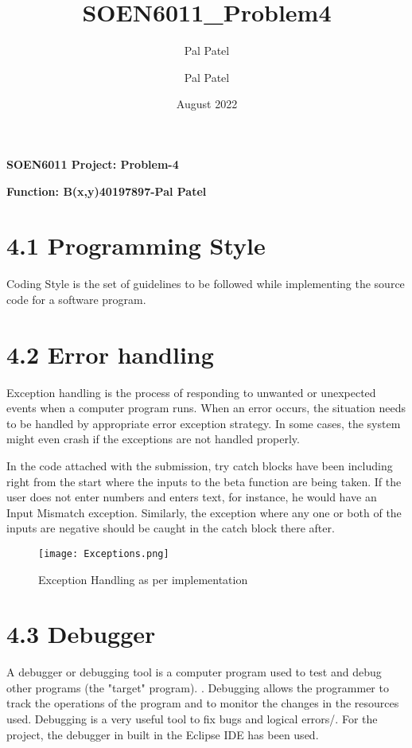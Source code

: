 \documentclass{report}
\title{SOEN6011_Problem4}
\author{Pal Patel}
\date{August 2022}
\begin{document}
\begin{center}\Large\textbf{SOEN6011 Project: Problem-4}\end{center}
\begin{center}\author{Pal Patel}\end{center}

\begin{flushleft}\Large\textbf{Function: B(x,y)}\hfill\textbf{40197897-Pal Patel}\end{flushleft}

\section*{4.1 Programming Style}
Coding Style is the set of guidelines to be followed while implementing the source code for a software program\cite{programming}.

\section*{4.2 Error handling}
Exception handling is the process of responding to unwanted or unexpected events when a computer program runs\cite{erorrs}.
When an error occurs, the situation needs to be handled by appropriate error exception strategy. In some cases, the system might even crash if the exceptions are not handled properly.

In the code attached with the submission, try catch blocks have been including right from the start where the inputs to the beta function are being taken. If the user does not enter numbers and enters text, for instance, he would have an Input Mismatch exception. Similarly, the exception where any one or both of the inputs are negative should be caught in the catch block there after.
\newline
\begin{figure}[h!]
\centering
   \texttt{[image: Exceptions.png]}
   \caption{Exception Handling as per implementation}
\end{figure}
\pagebreak


\section*{4.3 Debugger}
A debugger or debugging tool is a computer program used to test and debug other programs (the "target" program).  \cite{debug}.
Debugging allows the programmer to track the operations of the program and to monitor the changes in the resources used.
Debugging is a very useful tool to fix bugs and logical errors/.
For the project, the debugger in built in the Eclipse IDE has been used.
\end{document}
